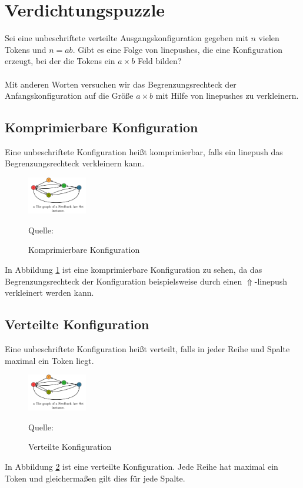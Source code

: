 \documentclass[seminar,german]{algothesis}
\newcommand*{\quelle}{%
  \footnotesize Quelle:
}
\begin{document}
\section{Verdichtungspuzzle}
Sei eine unbeschriftete verteilte Ausgangskonfiguration gegeben mit $n$ vielen Tokens und $n=ab$. Gibt es eine Folge von linepushes, die eine Konfiguration erzeugt, bei der die Tokens ein $a\times b$ Feld bilden? \\\\
Mit anderen Worten versuchen wir das Begrenzungsrechteck der Anfangskonfiguration auf die Größe $a\times b$ mit Hilfe von linepushes zu verkleinern.

\subsection{Komprimierbare Konfiguration}
\begin{definition}
Eine unbeschriftete Konfiguration heißt komprimierbar, falls ein linepush das Begrenzungsrechteck verkleinern kann.
\end{definition}
\begin{figure}[ht]
	\centering
	\includegraphics[width=0.23\textwidth]{graph}
	\caption{Komprimierbare Konfiguration}
	\quelle \cite{akitaya2022pushing}
	\label{fig:8}
\end{figure}

\noindent In Abbildung \ref{fig:8} ist eine komprimierbare Konfiguration zu sehen, da das Begrenzungsrechteck der Konfiguration beispielsweise durch einen $\Uparrow$-linepush verkleinert werden kann.

\subsection{Verteilte Konfiguration}
\begin{definition}
Eine unbeschriftete Konfiguration heißt verteilt, falls in jeder Reihe und Spalte maximal ein Token liegt.
\end{definition}
\begin{figure}[ht]
	\centering
	\includegraphics[width=0.23\textwidth]{graph}
	\caption{Verteilte Konfiguration}
	\quelle \cite{akitaya2022pushing}
	\label{fig:9}
\end{figure}
\noindent In Abbildung \ref{fig:9} ist eine verteilte Konfiguration. Jede Reihe hat maximal ein Token und gleichermaßen gilt dies für jede Spalte.
\end{document}

